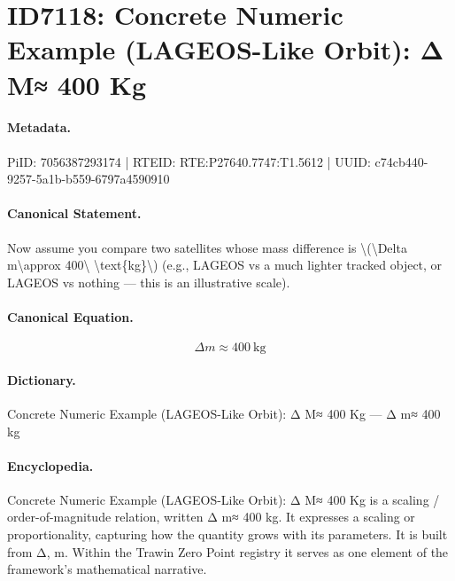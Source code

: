 \section*{ID7118: Concrete Numeric Example (LAGEOS-Like Orbit): Δ M≈ 400 Kg}
\paragraph{Metadata.}
PiID: 7056387293174 | RTEID: RTE:P27640.7747:T1.5612 | UUID: c74cb440-9257-5a1b-b559-6797a4590910

\paragraph{Canonical Statement.}
Now assume you compare two satellites whose mass difference is \textbackslash{}(\textbackslash{}Delta m\textbackslash{}approx 400\textbackslash{} \textbackslash{}text\{kg\}\textbackslash{}) (e.g., LAGEOS vs a much lighter tracked object, or LAGEOS vs nothing — this is an illustrative scale).

\paragraph{Canonical Equation.}
\[
\Delta m\approx 400\ \text{kg}
\]

\paragraph{Dictionary.}
Concrete Numeric Example (LAGEOS-Like Orbit): Δ M≈ 400 Kg — Δ m≈ 400 kg

\paragraph{Encyclopedia.}
Concrete Numeric Example (LAGEOS-Like Orbit): Δ M≈ 400 Kg is a scaling / order-of-magnitude relation, written Δ m≈ 400 kg. It expresses a scaling or proportionality, capturing how the quantity grows with its parameters. It is built from Δ, m. Within the Trawin Zero Point registry it serves as one element of the framework's mathematical narrative.
